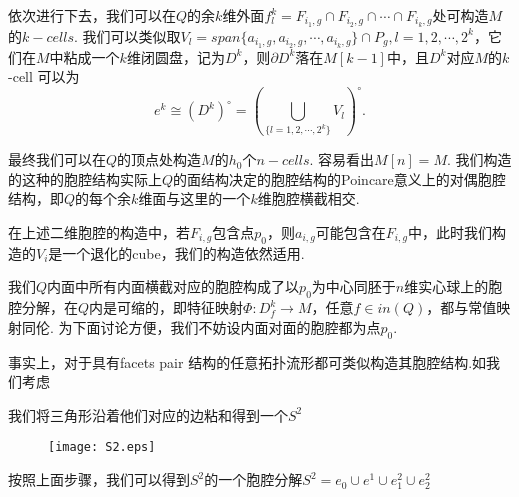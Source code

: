 \documentclass{article}
\theoremstyle{plain}%
\theoremstyle{definition}
\theoremstyle{remark}
\begin{document}
{依次进行下去，我们可以在$Q$的余$k$维外面$f_l^k=F_{i_1,g}\cap F_{i_2,g}\cap \cdots \cap F_{i_k,g}$处可构造$M$的$k-cells$. 我们可以类似取$V_l=span\{a_{i_1,g}, a_{i_2,g},\cdots, a_{i_k,g}\}\cap P_g, l=1,2,\cdots,2^k$，它们在$M$中粘成一个$k$维闭圆盘，记为$D^k$，则$\partial D^k$落在$M[k-1]$中，且$D^k$对应$M$的$k$-cell 可以为
\begin{equation*}\label{eq3}
e^k\cong (D^k)^\circ=\left(\bigcup_{\{l=1,2,\cdots,2^k\}} V_l\right)^{\circ}.
\end{equation*}

 最终我们可以在$Q$的顶点处构造$M$的$h_0$个$n-cells$. 容易看出$M[n]=M$. 我们构造的这种的胞腔结构实际上$Q$的面结构决定的胞腔结构的Poincare意义上的对偶胞腔结构，即$Q$的每个余$k$维面与这里的一个$k$维胞腔横截相交. 

{\rem 在上述二维胞腔的构造中，若$ F_{i,g}$包含点$p_0$，则$a_{i,g}$可能包含在$F_{i,g}$中，此时我们构造的$V_i$是一个退化的cube，我们的构造依然适用.  

我们$Q$内面中所有内面横截对应的胞腔构成了以$p_0$为中心同胚于$n$维实心球上的胞腔分解，在$Q$内是可缩的，即特征映射$\Phi:D_f^k\longrightarrow M$，任意$f\in in(Q)$，都与常值映射同伦. 为下面讨论方便，我们不妨设内面对面的胞腔都为点$p_0$.}

事实上，对于具有facets pair 结构的任意拓扑流形都可类似构造其胞腔结构.如我们考虑
{\exmp 我们将三角形沿着他们对应的边粘和得到一个$S^2$
\begin{figure}[H]
 \centering
 \texttt{[image: S2.eps]}
\end{figure}
按照上面步骤，我们可以得到$S^2$的一个胞腔分解$S^2=e_0\cup e^1 \cup e_1^2\cup e_2^2$}


}
\end{document}
